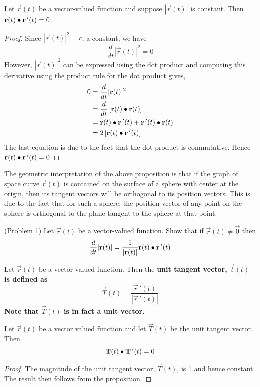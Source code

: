 \documentclass[handout]{ximera}
\begin{document}
\begin{proposition}
Let $\vec r(t)$ be a vector-valued function and suppose $|\vec r(t)|$ is constant. Then $\mathbf r(t) \bullet \mathbf r\,'(t) = 0$.\\
\end{proposition}
\begin{proof}
Since $|\vec r(t)|^2 = c$, a constant, we have
\[
\frac{d}{dt} |\vec r(t)|^2 = 0
\]
However, $|\vec r(t)|^2$ can be expressed using the dot product and computing this derivative using the product rule for the dot product gives,
\begin{align*}
0 &= \frac{d}{dt} |\mathbf r(t)|^2 \\
&= \frac{d}{dt} \left[\mathbf r(t) \bullet \mathbf r(t)\right] \\
  &= \mathbf r(t) \bullet \mathbf r\,'(t) + \mathbf r\,'(t) \bullet \mathbf r(t) \\
  &= 2 \left[\mathbf r(t) \bullet \mathbf r\,'(t)\right]
\end{align*}
The last equation is due to the fact that the dot product is commutative. Hence $\mathbf r(t) \bullet \mathbf r\,'(t) = 0$
\end{proof}

\begin{remark}
The geometric interpretation of the above proposition is that if the graph of space curve $\vec r(t)$ is contained 
on the surface of a sphere with center at the origin,
then its tangent vectors will be orthogonal to its position vectors.  
This is due to the fact that for such a sphere, the position vector of any point on the sphere is 
orthogonal to the plane tangent to the sphere at that point.
\end{remark}

\begin{problem}(Problem 1)
Let $\vec r(t)$ be a vector-valued function. Show that if $\vec r(t) \neq \vec 0$ then 
\[
\frac{d}{dt} |\mathbf r(t)| = \frac{1}{|\mathbf r(t)|} \mathbf r(t) \bullet \mathbf r\,'(t)
\]
\end{problem}

\begin{definition}
Let $\vec r(t)$ be a vector-valued function. Then the \bf{unit tangent vector}, $\vec t(t)$ is defined as
\[
\vec T(t) = \frac{\vec r\,'(t)}{|\vec r\,'(t)|}
\]
Note that $\vec T(t)$ is in fact a unit vector.
\end{definition}

\begin{corollary}
Let $\vec r(t)$ be a vector valued function and let $\vec T(t)$ be the unit tangent vector.
Then 
\[
\mathbf T(t) \bullet \mathbf T\,'(t) = 0
\]
\end{corollary}
\begin{proof}
The magnitude of the unit tangent vector, $\vec T(t)$, is 1 and hence constant. The result then follows from the proposition.
\end{proof}
\end{document}
